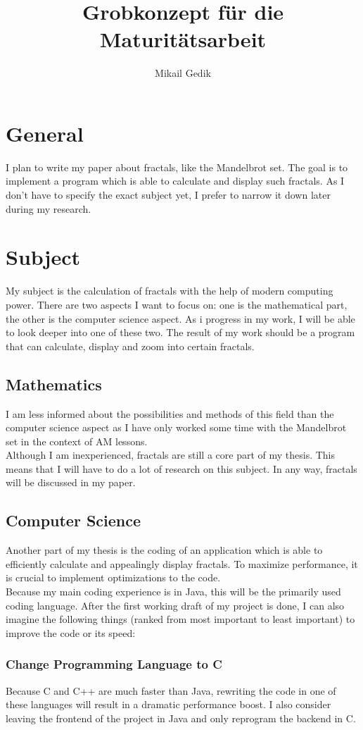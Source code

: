 \documentclass[10pt,a4paper]{article}
\title{Grobkonzept für die Maturitätsarbeit}
\author{Mikail Gedik}
\begin{document}
	\maketitle
	\section{General}
	I plan to write my paper about fractals, like the Mandelbrot set. The goal is to implement a program which is able to calculate and display such fractals. As I don't have to specify the exact subject yet, I prefer to narrow it down later during my research.
	\section{Subject}
	My subject is the calculation of fractals with the help of modern computing power. There are two aspects I want to focus on: one is the mathematical part, the other is the computer science aspect. As i progress in my work, I will be able to look deeper into one of these two. The result of my work should be a program that can calculate, display and zoom into certain fractals.
	\subsection{Mathematics}
	I am less informed about the possibilities and methods of this field than the computer science aspect as I have only worked some time with the Mandelbrot set in the context of AM lessons.\\
	Although I am inexperienced, fractals are still a core part of my thesis. This means that I will have to do a lot of research on this subject. In any way, fractals will be discussed in my paper.
	\subsection{Computer Science}
	Another part of my thesis is the coding of an application which is able to efficiently calculate and appealingly display fractals. To maximize performance, it is crucial to implement optimizations to the code.\\
	Because my main coding experience is in Java, this will be the primarily used coding language. After the first working draft of my project is done, I can also imagine the following things (ranked from most important to least important) to improve the code or its speed:
	\subsubsection{Change Programming Language to C}
	Because C and C++ are much faster than Java, rewriting the code in one of these languages will result in a dramatic performance boost. I also consider leaving the frontend of the project in Java and only reprogram the backend in C.
\end{document}
